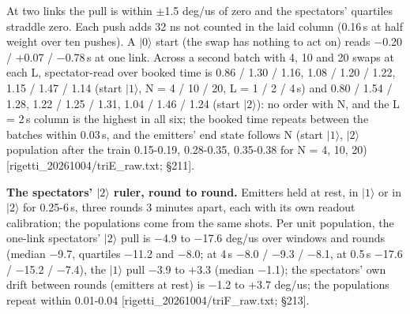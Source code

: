 \documentclass[11pt]{article}
\begin{document}
\par\smallskip\noindent{}\par\smallskip
At two links the pull is within \(\pm\)1.5 deg/us of zero and the spectators' quartiles straddle zero. Each push adds 32 ns not counted in the laid column (0.16\,\textmu s at half weight over ten pushes). A \(|0\rangle\) start (the swap has nothing to act on) reads \(-\)0.20 / +0.07 / \(-\)0.78\,\textmu s at one link. Across a second batch with 4, 10 and 20 swaps at each L, spectator-read over booked time is 0.86 / 1.30 / 1.16, 1.08 / 1.20 / 1.22, 1.15 / 1.47 / 1.14 (start \(|1\rangle\), N = 4 / 10 / 20, L = 1 / 2 / 4\,\textmu s) and 0.80 / 1.54 / 1.28, 1.22 / 1.25 / 1.31, 1.04 / 1.46 / 1.24 (start \(|2\rangle\)): no order with N, and the L = 2\,\textmu s column is the highest in all six; the booked time repeats between the batches within 0.03\,\textmu s, and the emitters' end state follows N (start \(|1\rangle\), \(|2\rangle\) population after the train 0.15-0.19, 0.28-0.35, 0.35-0.38 for N = 4, 10, 20) {[}rigetti\_20261004/triE\_raw.txt; \S{}211{]}.

\textbf{The spectators' \(|2\rangle\) ruler, round to round.} Emitters held at rest, in \(|1\rangle\) or in \(|2\rangle\) for 0.25-6\,\textmu s, three rounds 3 minutes apart, each with its own readout calibration; the populations come from the same shots. Per unit population, the one-link spectators' \(|2\rangle\) pull is \(-\)4.9 to \(-\)17.6 deg/us over windows and rounds (median \(-\)9.7, quartiles \(-\)11.2 and \(-\)8.0; at 4\,\textmu s \(-\)8.0 / \(-\)9.3 / \(-\)8.1, at 0.5\,\textmu s \(-\)17.6 / \(-\)15.2 / \(-\)7.4), the \(|1\rangle\) pull \(-\)3.9 to +3.3 (median \(-\)1.1); the spectators' own drift between rounds (emitters at rest) is \(-\)1.2 to +3.7 deg/us; the populations repeat within 0.01-0.04 {[}rigetti\_20261004/triF\_raw.txt; \S{}213{]}.
\end{document}
